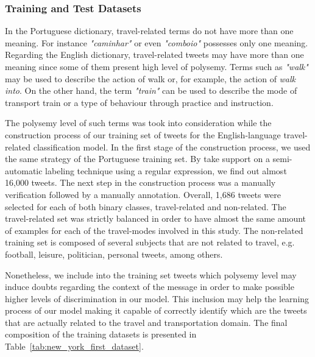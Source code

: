 \subsubsection{Training and Test Datasets}

In the Portuguese dictionary, travel-related terms do not have more than one meaning. For instance \emph{"caminhar"} or even \emph{"comboio"} possesses only one meaning. Regarding the English dictionary, travel-related tweets may have more than one meaning since some of them present high level of polysemy. Terms such as \emph{"walk"} may be used to describe the action of walk or, for example, the action of \emph{walk into}. On the other hand, the term \emph{"train"} can be used to describe the mode of transport train or a type of behaviour through practice and instruction.

The polysemy level of such terms was took into consideration while the construction process of our training set of tweets for the English-language travel-related classification model. In the first stage of the construction process, we used the same strategy of the Portuguese training set. By take support on a semi-automatic labeling technique using a regular expression, we find out almost 16,000 tweets. The next step in the construction process was a manually verification followed by a manually annotation. Overall, 1,686 tweets were selected for each of both binary classes, travel-related and non-related. The travel-related set was strictly balanced in order to have almost the same amount of examples for each of the travel-modes involved in this study. The non-related training set is composed of several subjects that are not related to travel, e.g. football, leisure, politician, personal tweets, among others.

Nonetheless, we include into the training set tweets which polysemy level may induce doubts regarding the context of the message in order to make possible higher levels of discrimination in our model. This inclusion may help the learning process of our model making it capable of correctly identify which are the tweets that are actually related to the travel and transportation domain.
The final composition of the training datasets is presented in Table~\ref{tab:new_york_first_dataset}.

